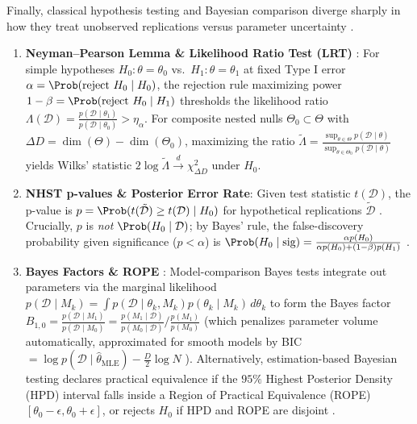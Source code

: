 \documentclass[../../../../master.tex]{subfiles}
\begin{document}
Finally, classical hypothesis testing and Bayesian comparison diverge sharply in how they treat unobserved replications versus parameter uncertainty  .

\begin{coremath}
\begin{enumerate}
  \item \textbf{Neyman--Pearson Lemma \& Likelihood Ratio Test (LRT)} : For simple hypotheses $H_0: \theta = \theta_0$ vs.\ $H_1: \theta = \theta_1$ at fixed Type I error $\alpha = \Prob(\text{reject } H_0 \mid H_0)$, the rejection rule maximizing power $1 - \beta = \Prob(\text{reject } H_0 \mid H_1)$ thresholds the likelihood ratio $\Lambda(\mathcal{D}) = \frac{p(\mathcal{D}\mid\theta_1)}{p(\mathcal{D}\mid\theta_0)} > \eta_\alpha$. For composite nested nulls $\Theta_0 \subset \Theta$ with $\Delta D = \dim(\Theta) - \dim(\Theta_0)$, maximizing the ratio $\tilde{\Lambda} = \frac{\sup_{\theta\in\Theta} p(\mathcal{D}\mid\theta)}{\sup_{\theta\in\Theta_0} p(\mathcal{D}\mid\theta)}$ yields Wilks' statistic $2\log\tilde{\Lambda} \xrightarrow{d} \chi^2_{\Delta D}$ under $H_0$.
  \item \textbf{NHST p-values \& Posterior Error Rate}: Given test statistic $t(\mathcal{D})$, the p-value is $p = \Prob(t(\tilde{\mathcal{D}}) \ge t(\mathcal{D}) \mid H_0)$ for hypothetical replications $\tilde{\mathcal{D}}$ . Crucially, $p$ is \emph{not} $\Prob(H_0 \mid \mathcal{D})$; by Bayes' rule, the false-discovery probability given significance ($p < \alpha$) is $\Prob(H_0 \mid \text{sig}) = \frac{\alpha p(H_0)}{\alpha p(H_0) + (1-\beta)p(H_1)}$ .
  \item \textbf{Bayes Factors \& ROPE} : Model-comparison Bayes tests integrate out parameters via the marginal likelihood $p(\mathcal{D}\mid M_k) = \int p(\mathcal{D}\mid\theta_k, M_k)p(\theta_k \mid M_k)\,d\theta_k$ to form the Bayes factor $B_{1,0} = \frac{p(\mathcal{D}\mid M_1)}{p(\mathcal{D}\mid M_0)} = \frac{p(M_1\mid\mathcal{D})}{p(M_0\mid\mathcal{D})} / \frac{p(M_1)}{p(M_0)}$ (which penalizes parameter volume automatically, approximated for smooth models by BIC $= \log p(\mathcal{D}\mid\hat{\theta}_{\mathrm{MLE}}) - \frac{D}{2}\log N$ ). Alternatively, estimation-based Bayesian testing declares practical equivalence if the $95\%$ Highest Posterior Density (HPD) interval falls inside a Region of Practical Equivalence (ROPE) $[\theta_0 - \epsilon, \theta_0 + \epsilon]$, or rejects $H_0$ if HPD and ROPE are disjoint .
\end{enumerate}
\end{coremath}
\end{document}
